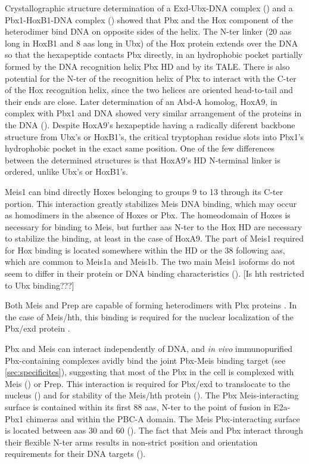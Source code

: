 Crystallographic structure determination of a Exd-Ubx-DNA complex (\cite{Passner1999}) and a Pbx1-HoxB1-DNA complex (\cite{Piper1999}) showed that Pbx and the Hox component of the heterodimer bind DNA on opposite sides of the helix. The \ac{N-ter} linker (20 \acp{aa} long in HoxB1 and 8 \acp{aa} long in Ubx) of the Hox protein extends over the DNA so that the hexapeptide contacts Pbx directly, in an hydrophobic pocket partially formed by the DNA recognition helix Pbx \ac{HD} and by its \ac{TALE}. There is also potential for the \ac{N-ter} of the recognition helix of Pbx to interact with the \ac{C-ter} of the Hox recognition helix, since the two helices are oriented head-to-tail and their ends are close. Later determination of an \ac{Abd-A} homolog, HoxA9, in complex with Pbx1 and DNA showed very similar arrangement of the proteins in the DNA (\cite{LaRonde-LeBlanc2003}). Despite HoxA9's hexapeptide having a radically diferent backbone structure from Ubx's or HoxB1's, the critical tryptophan residue slots into Pbx1's hydrophobic pocket in the exact same position. One of the few differences between the determined structures is that HoxA9's \ac{HD} N-terminal linker is ordered, unlike Ubx's or HoxB1's.


Meis1 can bind directly Hoxes belonging to groups 9 to 13 through its \ac{C-ter} portion. This interaction greatly stabilizes Meis DNA binding, which may occur as homodimers in the absence of Hoxes or Pbx. The homeodomain of Hoxes is necessary for binding to Meis, but further \acp{aa} \ac{N-ter} to the Hox \ac{HD} are necessary to stabilize the binding, at least in the case of HoxA9. The part of Meis1 required for Hox binding is located somewhere within the \ac{HD} or the 38 following \acp{aa}, which are common to Meis1a and Meis1b. The two main Meis1 isoforms do not seem to differ in their protein or DNA binding characteristics (\cite{Shen1997}). [Is hth restricted to Ubx binding???]

Both Meis and Prep are capable of forming heterodimers with Pbx proteins \cite{ref}. In the case of Meis/\ac{hth}, this binding is required for the nuclear localization of the Pbx/\ac{exd} protein \cite{ref}.

Pbx and Meis can interact independently of DNA, and \textit{in vivo} immunopurified Pbx-containing complexes avidly bind the joint Pbx-Meis binding target (see \ref{sec:specificites}), suggesting that most of the Pbx in the cell is complexed with Meis (\cite{Chang1997}) or Prep. This interaction is required for Pbx/exd to translocate to the nucleus (\cite{Rieckhof1997}) and for stability of the Meis/hth protein (\cite{Abu-Shaar1998}). The Pbx Meis-interacting surface is contained within its first 88 \acp{aa}, \ac{N-ter} to the point of fusion in E2a-Pbx1 chimeras and within the PBC-A domain. The Meis Pbx-interacting surface is located between \acp{aa} 30 and 60 (\cite{Chang1997}). The fact that Meis and Pbx interact through their flexible \ac{N-ter} arms results in non-strict position and orientation requirements for their DNA targets (\cite{Jacobs1999}).

